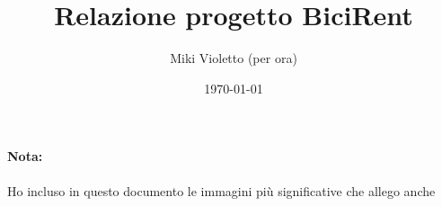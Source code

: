 \documentclass[10pt,a4paper,italian]{article}
\author{Miki Violetto (per ora)}
\title{Relazione progetto BiciRent}
\date{\today}
\begin{document}
\maketitle

\newpage
\paragraph{Nota:}
Ho incluso in questo documento le immagini più significative che allego anche
\end{document}
